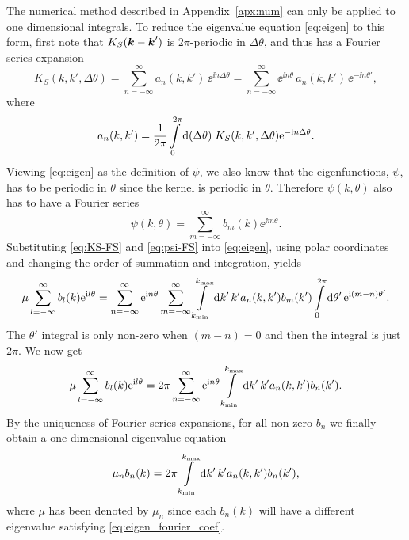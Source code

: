 \documentclass[11pt,a4paper, 
swedish,english %
]{article}
\begin{document}
The numerical method described in Appendix~\ref{apx:num} can only be
applied to one dimensional integrals.
To reduce the eigenvalue equation \eqref{eq:eigen} to this form, first
note that $K_S(\vb*k-\vb*k')$ is $2\pi$-periodic in $\Delta\theta$,
and thus has a Fourier series expansion  
\begin{equation} \label{eq:KS-FS}
K_S(k, k', \Delta\theta)  
=\sum_{n=-\infty}^\infty a_{n}(k, k')\, \ee^{\ii n\Delta\theta}
=\sum_{n=-\infty}^\infty \ee^{\ii n\theta}\,a_{n}(k, k')\,\ee^{-\ii n\theta'},
\end{equation}
where 
\begin{equation} \label{eq:KS-FS-coef}
a_{n}(k, k') = \frac{1}{2\pi} \int_0^{2\pi} \rd(\Delta\theta)\; 
K_S(k, k', \Delta\theta)\ee^{-\ii n\Delta\theta}.
\end{equation}
Viewing \eqref{eq:eigen} as the definition of $\psi$, we also know
that the eigenfunctions, $\psi$, has to be periodic in 
$\theta$ since the kernel is periodic in $\theta$. Therefore
$\psi(k, \theta)$ also has to have a Fourier series 
\begin{equation}\label{eq:psi-FS}
\psi(k, \theta) = \sum_{m=-\infty}^\infty b_m(k)\ee^{\ii m\theta}.
\end{equation}
Substituting \eqref{eq:KS-FS} and \eqref{eq:psi-FS} into
\eqref{eq:eigen}, using polar coordinates and changing the order of
summation and integration, yields
\begin{equation}
\mu\sum_{l=-\infty}^\infty b_l(k)\ee^{\ii l\theta}
= \sum_{n=-\infty}^\infty \ee^{\ii n\theta} \sum_{m=-\infty}^\infty 
\int_{k_{\min}}^{k_{\max}}\rd{k'}\,k' a_n(k, k') b_m(k')
\int_{0}^{2\pi}\rd\theta'\,
\ee^{\ii (m-n)\theta'}.
\end{equation}
The $\theta'$ integral is only non-zero when $(m-n)=0$ and
then the integral is just $2\pi$. We now get
\begin{equation}
\mu\sum_{l=-\infty}^\infty b_l(k)\ee^{\ii l\theta}
= 2\pi\sum_{n=-\infty}^\infty \ee^{\ii n\theta} 
\int_{k_{\min}}^{k_{\max}}\rd{k'}\,k' a_n(k, k') b_n(k').
\end{equation}
By the uniqueness of Fourier series expansions, for all non-zero $b_n$
we finally obtain a one dimensional eigenvalue equation
\begin{equation}
\label{eq:eigen_fourier_coef}
\mu_n b_n(k) = 2\pi\int_{k_{\min}}^{k_{\max}}\rd{k'}\,k' a_n(k, k') b_n(k'),
\end{equation}
where $\mu$ has been denoted by $\mu_n$ since each $b_n(k)$
will have a different eigenvalue satisfying
\eqref{eq:eigen_fourier_coef}.  
\end{document}
